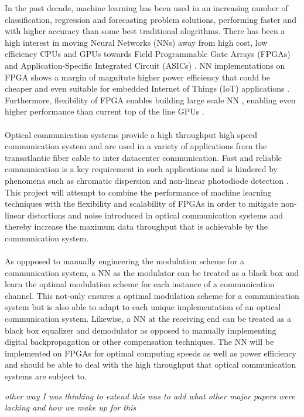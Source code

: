 In the past decade, machine learning has been used in an increasing number of classification, regression and forecasting problem solutions, performing faster and with higher accuracy than some best traditional alogrithms. There has been a high interest in moving Neural Networks (NNs) away from high cost, low efficiency CPUs and GPUs towards Field Programmable Gate Arrays (FPGAs) and Application-Specific Integrated Circuit (ASICs) \autocite{7929192}. NN implementations on FPGA shows a margin of magnitute higher power efficiency that could be cheaper and even suitable for embedded Internet of Things (IoT) applications \autocite{7799795,8954866,8469659,8330546,8693488}. Furthermore, flexibility of FPGA enables building large scale NN \autocite{8823487,7045812}, enabling even higher performance than current top of the line GPUs \autocite{8702332,8412552}. 
\\
\\
Optical communication systems provide a high throughput high speed communication system and are used in a variety of applications from the transatlantic fiber cable to inter datacenter communication. Fast and reliable communication is a key requirement in such applications and is hindered by phenomena such as chromatic dispersion and non-linear photodiode detection \autocite{8433895}. This project will attempt to combine the performance of machine learning techniques with the flexibility and scalability of FPGAs in order to mitigate non-linear distortions and noise introduced in optical communication systems and thereby increase the maximum data throughput that is achievable by the communication system. 
\\
\\
As oppposed to manually engineering the modulation scheme for a communication system, a NN as the modulator can be treated as a black box and learn the optimal modulation scheme for each instance of a communication channel. This not-only ensures a optimal modulation scheme for a communication system but is also able to adapt to each unique implementation of an optical communication system. Likewise, a NN at the receiving end can be treated as a black box equalizer and demodulator  as opposed to manually implementing digital backpropagation or other compensation techniques. The NN will be implemented on FPGAs for optimal computing speeds as well as power efficiency and should be able to deal with the high throughput that optical communication systems are subject to. 

\newline \newline \textit{other way I was thinking to extend this was to add what other major papers were lacking and how we make up for this} 
